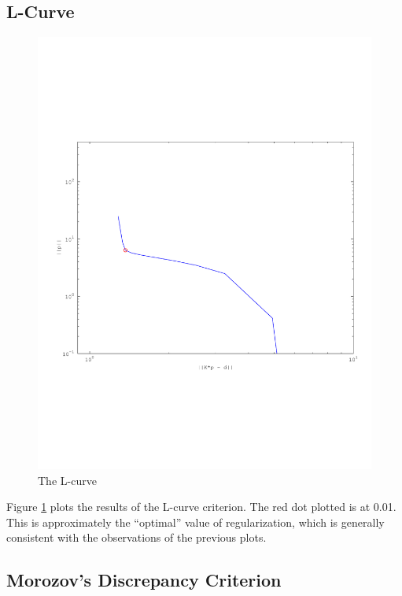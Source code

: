 \documentclass{article}
\begin{document}
\subsection{L-Curve}

\begin{figure}[!htb]
  \includegraphics[scale=.6]{plots/L-curve.pdf}
  \caption{The L-curve} 
 \label{fig:lcurve}
\end{figure}

Figure \ref{fig:lcurve} plots the results of the L-curve criterion. The
red dot plotted is at 0.01. This is approximately the ``optimal'' value
of regularization, which is generally consistent with the observations
of the previous plots. 


\subsection{Morozov's Discrepancy Criterion}
\end{document}
